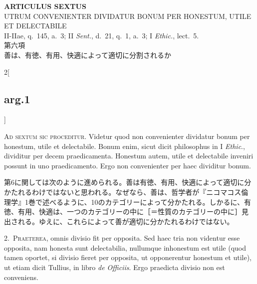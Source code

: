 \documentclass[paper=a4paper,fontsize=10pt,jafontsize=9pt,titlepage]{jlreq}
\begin{document}
\newpage
{}
{}
\setcounter{section}{6}
\setcounter{subsection}{0}

\begin{center}
 {\Large {\bfseries ARTICULUS SEXTUS}}\\
 {\large UTRUM CONVENIENTER DIVIDATUR BONUM PER HONESTUM, UTILE ET DELECTABILE}\\
 {\footnotesize II-IIae, q.~145, a.~3; II {\itshape Sent.}, d.~21, q.~1,
 a.~3; I {\itshape Ethic.}, lect.~5.}\\
 {\Large 第六項\\善は、有徳、有用、快適によって適切に分割されるか}
\end{center}

\begin{paracol}{2}[\subsection{arg.1}]

{\huge A}{\scshape d sextum sic proceditur}. Videtur quod non
 convenienter dividatur bonum per honestum, utile et delectabile. Bonum
 enim, sicut dicit philosophus in I {\itshape Ethic}., dividitur per decem
 praedicamenta. Honestum autem, utile et delectabile inveniri possunt in
 uno praedicamento. Ergo non convenienter per haec dividitur bonum.

\switchcolumn

第6に関しては次のように進められる。善は有徳、有用、快適によって適切に分
 かたれるわけではないと思われる。なぜなら、善は、哲学者が『ニコマコス倫
 理学』1巻で述べるように、10のカテゴリーによって分かたれる。しかるに、有
 徳、有用、快適は、一つのカテゴリーの中に［＝性質のカテゴリーの中に］見
 出される。ゆえに、これらによって善が適切に分かたれるわけではない。


2.~{\scshape Praeterea}, omnis divisio fit per opposita. Sed haec tria non
 videntur esse opposita, nam honesta sunt delectabilia, nullumque
 inhonestum est utile (quod tamen oportet, si divisio fieret per
 opposita, ut opponerentur honestum et utile), ut etiam dicit Tullius,
 in libro {\itshape de Officiis}. Ergo praedicta divisio non est conveniens.

\switchcolumn


\end{paracol}
\end{document}
